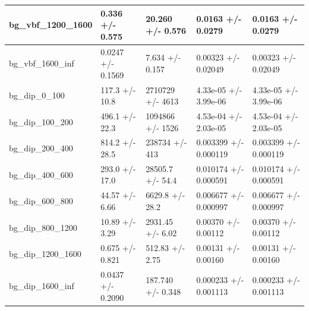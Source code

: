\documentclass[a4paper, 10pt]{article}
\begin{document}
\begin{table}[H]
\begin{center}
\begin{tabular}{|m{20.0mm}|m{27.0mm}|m{27.0mm}|m{33.0mm}|m{32.0mm}|}
      \hline
      {\cellcolor{white}         bg\_vbf\_1200\_1600}& {\cellcolor{white}         0.336 +/\-- 0.575}& {\cellcolor{white}         20.260 +/\-- 0.576}& {\cellcolor{white}         0.0163 +/\-- 0.0279}& {\cellcolor{white}         0.0163 +/\-- 0.0279}\\
      \hline
      {\cellcolor{white}         bg\_vbf\_1600\_inf}& {\cellcolor{white}         0.0247 +/\-- 0.1569}& {\cellcolor{white}         7.634 +/\-- 0.157}& {\cellcolor{white}         0.00323 +/\-- 0.02049}& {\cellcolor{white}         0.00323 +/\-- 0.02049}\\
      \hline
      {\cellcolor{white}         bg\_dip\_0\_100}& {\cellcolor{white}         117.3 +/\-- 10.8}& {\cellcolor{white}         2710729 +/\-- 4613}& {\cellcolor{white}         4.33e-05 +/\-- 3.99e-06}& {\cellcolor{white}         4.33e-05 +/\-- 3.99e-06}\\
      \hline
      {\cellcolor{white}         bg\_dip\_100\_200}& {\cellcolor{white}         496.1 +/\-- 22.3}& {\cellcolor{white}         1094866 +/\-- 1526}& {\cellcolor{white}         4.53e-04 +/\-- 2.03e-05}& {\cellcolor{white}         4.53e-04 +/\-- 2.03e-05}\\
      \hline
      {\cellcolor{white}         bg\_dip\_200\_400}& {\cellcolor{white}         814.2 +/\-- 28.5}& {\cellcolor{white}         238734 +/\-- 413}& {\cellcolor{white}         0.003399 +/\-- 0.000119}& {\cellcolor{white}         0.003399 +/\-- 0.000119}\\
      \hline
      {\cellcolor{white}         bg\_dip\_400\_600}& {\cellcolor{white}         293.0 +/\-- 17.0}& {\cellcolor{white}         28505.7 +/\-- 54.4}& {\cellcolor{white}         0.010174 +/\-- 0.000591}& {\cellcolor{white}         0.010174 +/\-- 0.000591}\\
      \hline
      {\cellcolor{white}         bg\_dip\_600\_800}& {\cellcolor{white}         44.57 +/\-- 6.66}& {\cellcolor{white}         6629.8 +/\-- 28.2}& {\cellcolor{white}         0.006677 +/\-- 0.000997}& {\cellcolor{white}         0.006677 +/\-- 0.000997}\\
      \hline
      {\cellcolor{white}         bg\_dip\_800\_1200}& {\cellcolor{white}         10.89 +/\-- 3.29}& {\cellcolor{white}         2931.45 +/\-- 6.02}& {\cellcolor{white}         0.00370 +/\-- 0.00112}& {\cellcolor{white}         0.00370 +/\-- 0.00112}\\
      \hline
      {\cellcolor{white}         bg\_dip\_1200\_1600}& {\cellcolor{white}         0.675 +/\-- 0.821}& {\cellcolor{white}         512.83 +/\-- 2.75}& {\cellcolor{white}         0.00131 +/\-- 0.00160}& {\cellcolor{white}         0.00131 +/\-- 0.00160}\\
      \hline
      {\cellcolor{white}         bg\_dip\_1600\_inf}& {\cellcolor{white}         0.0437 +/\-- 0.2090}& {\cellcolor{white}         187.740 +/\-- 0.348}& {\cellcolor{white}         0.000233 +/\-- 0.001113}& {\cellcolor{white}         0.000233 +/\-- 0.001113}\\
\hline
    \end{tabular}
  \end{center}
\end{table}
\end{document}
